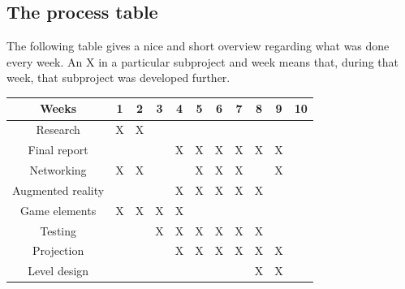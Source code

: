 		\subsection{The process table} \label{ssec:processtable}
			The following table gives a nice and short overview regarding what was done
			every week. An X in a particular subproject and week means that, during that
			week, that subproject was developed further.
			
			\begin{table}[!ht]                                                                                      
				\begin{tabular}{| c | c | c | c | c | c | c | c | c | c | c |}
				\hline
				Weeks             & 1      & 2      & 3      & 4      & 5      & 6      & 7      & 8      & 9      & 10     \\ \hline
				Research          & X      & X      & \space & \space & \space & \space & \space & \space & \space & \space \\ \hline
				Final report      & \space & \space & \space & X     & X      & X      & X      & X      & X      & \space \\ \hline
				Networking        & X      & X      & \space & \space & X      & X      & X      & \space & X      & \space \\ \hline
				Augmented reality & \space & \space & \space & X      & X      & X      & X      & X      & \space & \space \\ \hline
				Game elements     & X      & X      & X      & X      & \space & \space & \space & \space & \space & \space \\ \hline
				Testing           & \space & \space & X      & X      & X      & X      & X      & X      & \space & \space \\ \hline
				Projection        & \space & \space & \space & X      & X      & X      & X      & X      & X      & \space \\ \hline
				Level design      & \space & \space & \space & \space & \space & \space & \space & X      & X      & \space \\ \hline
				\end{tabular}
			\end{table}
